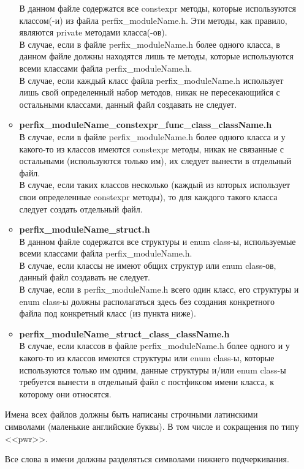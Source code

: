 \begin{enumerate}
\begin{itemize}
		В данном файле содержатся все constexpr методы, которые используются классом(-и) из файла perfix\_moduleName.h. Эти методы, как правило, являются private методами класса(-ов).\\
		В случае, если в файле perfix\_moduleName.h более одного класса, в данном файле должны находятся лишь те методы, которые используются всеми классами файла perfix\_moduleName.h.\\
		В случае, если каждый класс файла perfix\_moduleName.h использует лишь свой определенный набор методов, никак не пересекающийся с остальными классами, данный файл создавать не следует.
		\item \textbf{perfix\_moduleName\_constexpr\_func\_class\_className.h}\\
		В случае, если в файле perfix\_moduleName.h более одного класса и у какого-то из классов имеются constexpr методы, никак не связанные с остальными (используются только им), их следует вынести в отдельный файл.\\
		В случае, если таких классов несколько (каждый из которых использует свои определенные constexpr методы), то для каждого такого класса следует создать отдельный файл.
		\item \textbf{perfix\_moduleName\_struct.h}\\		
		В данном файле содержатся все структуры и enum class-ы, используемые всеми классами файла perfix\_moduleName.h.\\		
		В случае, если классы не имеют общих структур или enum class-ов, данный файл создавать не следует.\\		
		В случае, если в perfix\_moduleName.h всего один класс, его структуры и enum class-ы должны располагаться здесь без создания конкретного файла под конкретный класс (из пункта ниже).
		\item \textbf{perfix\_moduleName\_struct\_class\_className.h}\\		
		В случае, если классов в файле perfix\_moduleName.h более одного и у какого-то из классов имеются структуры или enum class-ы, которые используются только им одним, данные структуры и/или enum class-ы требуется вынести в отдельный файл с постфиксом имени класса, к которому они относятся.
	\end{itemize}

	Имена всех файлов должны быть написаны строчными латинскими символами (маленькие английские буквы). В том числе и сокращения по типу <<pwr>>.
	
	Все слова в имени должны разделяться символами нижнего подчеркивания. 
	

\end{enumerate}
